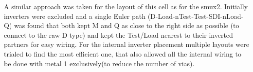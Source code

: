 
A similar approach was taken for the layout of this cell as for the smux2.
Initially inverters were excluded and a single Euler path
(D-Load-nTest-Test-SDI-nLoad-Q) was found that both
kept M and Q as close to the right side as possible (to connect to the raw
D-type) and  kept the Test/Load nearest to their inverted partners for easy wiring.
For the internal inverter placement multiple layouts were trialed to find the
most efficient one, that also allowed all the internal wiring to be done with
metal 1 exclusively(to reduce the number of vias).

